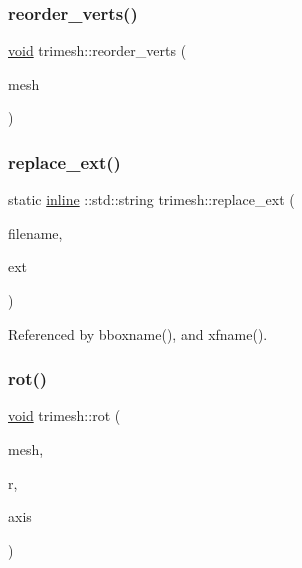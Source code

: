 \subsubsection{\texorpdfstring{reorder\+\_\+verts()}{reorder\_verts()}}
{\footnotesize\ttfamily \hyperlink{namespacetrimesh_a784ddfd979e1c579bda795a8edfc3f43}{void} trimesh\+::reorder\+\_\+verts (\begin{DoxyParamCaption}\item[{\hyperlink{classtrimesh_1_1TriMesh}{Tri\+Mesh} $\ast$}]{mesh }\end{DoxyParamCaption})}

\mbox{\label{namespacetrimesh_a19623fde9977f1ed5597291d8661621f}} 
\subsubsection{\texorpdfstring{replace\+\_\+ext()}{replace\_ext()}}
{\footnotesize\ttfamily static \hyperlink{XForm_8h_a00d24c7231be28dbaf71f5408f30e44c}{inline} \+::std\+::string trimesh\+::replace\+\_\+ext (\begin{DoxyParamCaption}\item[{const \+::std\+::string \&}]{filename,  }\item[{const \+::std\+::string \&}]{ext }\end{DoxyParamCaption})\hspace{0.3cm}{\ttfamily [static]}}



Referenced by bboxname(), and xfname().

\mbox{\label{namespacetrimesh_a56d92b6392bcb92a44c3fff9d26b7711}} 
\subsubsection{\texorpdfstring{rot()}{rot()}}
{\footnotesize\ttfamily \hyperlink{namespacetrimesh_a784ddfd979e1c579bda795a8edfc3f43}{void} trimesh\+::rot (\begin{DoxyParamCaption}\item[{\hyperlink{classtrimesh_1_1TriMesh}{Tri\+Mesh} $\ast$}]{mesh,  }\item[{float}]{r,  }\item[{const \hyperlink{namespacetrimesh_a4fc2b83feba99c931f837a0c7d4b4df1}{vec} \&}]{axis }\end{DoxyParamCaption})}



